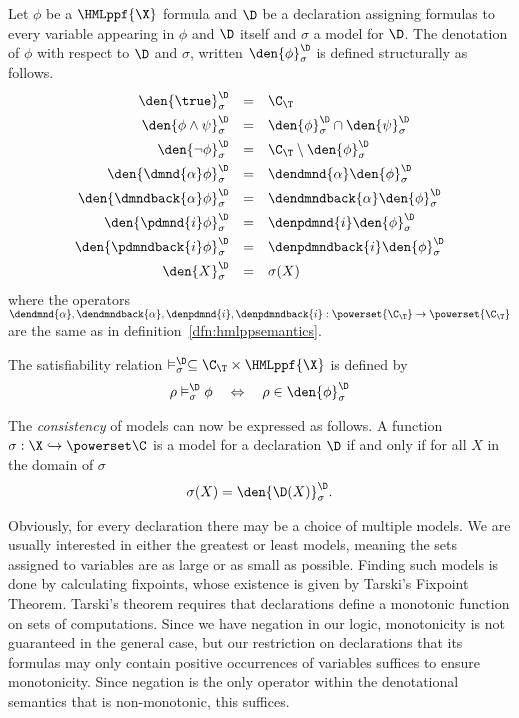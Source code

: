 \begin{definition}
    \label{dfn:hmlppfsemantics}

    Let $\phi$ be a $\HMLppf{\X}$ formula and $\D$ be a declaration assigning
    formulas to every variable appearing in $\phi$ and $\D$ itself and
    $\sigma$ a model for $\D$. 
    The denotation of $\phi$ with respect to $\D$ and $\sigma$,
    written $\den{\phi}^\D_\sigma$
    is defined structurally as follows.
    \[
    \begin{array}{r@{\quad}c@{\quad}l}
        \den{\true}^\D_\sigma &=&  \C_\T \\[4pt]
        \den{\phi\land\psi}^\D_\sigma &=& \den{\phi}^\D_\sigma \cap \den{\psi}^\D_\sigma \\[4pt]
        \den{\neg\phi}^\D_\sigma &=& \C_\T \setminus \den{\phi}^\D_\sigma \\[4pt]
        \den{\dmnd{\alpha}\phi}^\D_\sigma &=& \dendmnd{\alpha}\den{\phi}^\D_\sigma \\[4pt]
        \den{\dmndback{\alpha}\phi}^\D_\sigma &=& \dendmndback{\alpha}\den{\phi}^\D_\sigma \\[4pt]
        \den{\pdmnd{i}\phi}^\D_\sigma &=& \denpdmnd{i}\den{\phi}^\D_\sigma \\[4pt]
        \den{\pdmndback{i}\phi}^\D_\sigma &=& \denpdmndback{i}\den{\phi}^\D_\sigma \\[4pt]
        \den{X}^\D_\sigma &=& \sigma(X) \\
    \end{array}
    \]
    where the operators $\dendmnd{\alpha}, \dendmndback{\alpha},
    \denpdmnd{i}, \denpdmndback{i} : \powerset{\C_\T} \rightarrow \powerset{\C_\T}$
    are the same as in definition~\ref{dfn:hmlppsemantics}.

    The satisfiability relation $\vDash^\D_\sigma \subseteq \C_\T \times \HMLppf{\X}$
    is defined by
    \[
        \rho \vDash^\D_\sigma \phi  \quad\Leftrightarrow\quad \rho \in \den{\phi}^\D_\sigma
    \]
\end{definition}

The {\em consistency} of models can now be expressed as follows. A function 
$\sigma : \X \hookrightarrow \powerset\C$ is a model for a declaration $\D$
if and only if for all $X$ in the domain of $\sigma$
\[
\sigma(X) = \den{\D(X)}_\sigma^\D.
\]

Obviously, for every declaration there may be a choice of multiple models. 
We are usually interested in either the greatest or least models, meaning the
sets assigned to variables are as large or as small as possible. Finding such
models is done by calculating fixpoints, whose existence is given by Tarski's
Fixpoint Theorem. Tarski's theorem requires that declarations define
a monotonic function on sets of computations. Since we have negation in our logic,
monotonicity is not guaranteed in the general case, but our restriction on
declarations that its formulas may only contain positive occurrences of variables
suffices to ensure monotonicity.
Since negation is the only operator within the
denotational semantics that is non-monotonic, this suffices.

